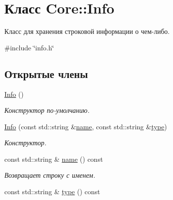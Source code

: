 \hypertarget{class_core_1_1_info}{}\section{Класс Core\+:\+:Info}
\label{class_core_1_1_info}


Класс для хранения строковой информации о чем-\/либо.  




{\ttfamily \#include \char`\"{}info.\+h\char`\"{}}

\subsection*{Открытые члены}
\begin{DoxyCompactItemize}
\item 
\hyperlink{class_core_1_1_info_aa78825dbbf00d030940c6db4e3784da5}{Info} ()\hypertarget{class_core_1_1_info_aa78825dbbf00d030940c6db4e3784da5}{}\label{class_core_1_1_info_aa78825dbbf00d030940c6db4e3784da5}

\begin{DoxyCompactList}\small\item\em Конструктор по-\/умолчанию. \end{DoxyCompactList}\item 
\hyperlink{class_core_1_1_info_a3598725146f48899643598bba51af4bc}{Info} (const std\+::string \&\hyperlink{class_core_1_1_info_a57765c8ec20443b58688232fa1382449}{name}, const std\+::string \&\hyperlink{class_core_1_1_info_a78d69b6d25831677b638f113f6a04691}{type})\hypertarget{class_core_1_1_info_a3598725146f48899643598bba51af4bc}{}\label{class_core_1_1_info_a3598725146f48899643598bba51af4bc}

\begin{DoxyCompactList}\small\item\em Конструктор. \end{DoxyCompactList}\item 
const std\+::string \& \hyperlink{class_core_1_1_info_a57765c8ec20443b58688232fa1382449}{name} () const \hypertarget{class_core_1_1_info_a57765c8ec20443b58688232fa1382449}{}\label{class_core_1_1_info_a57765c8ec20443b58688232fa1382449}

\begin{DoxyCompactList}\small\item\em Возвращает строку с именем. \end{DoxyCompactList}\item 
const std\+::string \& \hyperlink{class_core_1_1_info_a78d69b6d25831677b638f113f6a04691}{type} () const \hypertarget{class_core_1_1_info_a78d69b6d25831677b638f113f6a04691}{}\label{class_core_1_1_info_a78d69b6d25831677b638f113f6a04691}


\end{DoxyCompactItemize}
